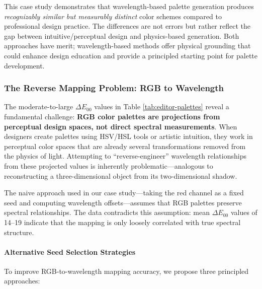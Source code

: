 \documentclass[12pt,a4paper]{article}
\newcommand{\deltaE}{\Delta E_{00}}
\begin{document}
This case study demonstrates that wavelength-based palette generation produces \emph{recognizably similar but measurably distinct} color schemes compared to professional design practice. The differences are not errors but rather reflect the gap between intuitive/perceptual design and physics-based generation. Both approaches have merit; wavelength-based methods offer physical grounding that could enhance design education and provide a principled starting point for palette development.

\subsubsection{The Reverse Mapping Problem: RGB to Wavelength}

The moderate-to-large $\deltaE$ values in Table \ref{tab:editor-palettes} reveal a fundamental challenge: \textbf{RGB color palettes are projections from perceptual design spaces, not direct spectral measurements}. When designers create palettes using HSV/HSL tools or artistic intuition, they work in perceptual color spaces that are already several transformations removed from the physics of light. Attempting to ``reverse-engineer'' wavelength relationships from these projected values is inherently problematic—analogous to reconstructing a three-dimensional object from its two-dimensional shadow.

The naive approach used in our case study—taking the red channel as a fixed seed and computing wavelength offsets—assumes that RGB palettes preserve spectral relationships. The data contradicts this assumption: mean $\deltaE$ values of 14--19 indicate that the mapping is only loosely correlated with true spectral structure.

\paragraph{Alternative Seed Selection Strategies}

To improve RGB-to-wavelength mapping accuracy, we propose three principled approaches:
\end{document}
